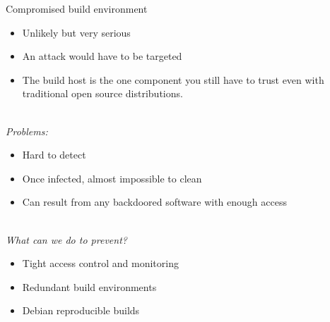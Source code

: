 \documentclass[11pt]{beamer}
\begin{document}
\begin{frame}{Compromised build environment}
\begin{itemize}
\item Unlikely but very serious\\
\item An attack would have to be targeted\\ %
\item The build host is the one component you still have to trust even with traditional open source distributions. %
\end{itemize}
\\[0.2cm]
\pause
\emph{Problems:}
\begin{itemize}
\item Hard to detect
\item Once infected, almost impossible to clean
\item Can result from any backdoored software with enough access
\end{itemize}
\\[0.2cm]
\pause
\emph{What can we do to prevent?}
\begin{itemize}
\item Tight access control and monitoring
\item Redundant build environments  
\item Debian reproducible builds    
\end{itemize}
\end{frame}
\end{document}
